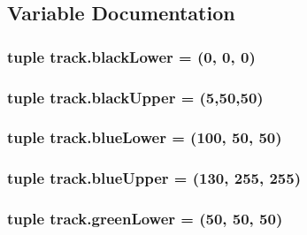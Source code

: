 \subsection{Variable Documentation}
\subsubsection[{\texorpdfstring{black\+Lower}{blackLower}}]{\setlength{\rightskip}{0pt plus 5cm}tuple track.\+black\+Lower = (0, 0, 0)}\hypertarget{namespacetrack_a4ee13246ec46c21cfdcfee1b16f7eec4}{}\label{namespacetrack_a4ee13246ec46c21cfdcfee1b16f7eec4}
\subsubsection[{\texorpdfstring{black\+Upper}{blackUpper}}]{\setlength{\rightskip}{0pt plus 5cm}tuple track.\+black\+Upper = (5,50,50)}\hypertarget{namespacetrack_a7c7120c727a2836315550f0091cd7277}{}\label{namespacetrack_a7c7120c727a2836315550f0091cd7277}
\subsubsection[{\texorpdfstring{blue\+Lower}{blueLower}}]{\setlength{\rightskip}{0pt plus 5cm}tuple track.\+blue\+Lower = (100, 50, 50)}\hypertarget{namespacetrack_a222fd73291da99272b344d9089ce0fde}{}\label{namespacetrack_a222fd73291da99272b344d9089ce0fde}
\subsubsection[{\texorpdfstring{blue\+Upper}{blueUpper}}]{\setlength{\rightskip}{0pt plus 5cm}tuple track.\+blue\+Upper = (130, 255, 255)}\hypertarget{namespacetrack_ae6e375645538a7968d81c8ebe9ee5b7d}{}\label{namespacetrack_ae6e375645538a7968d81c8ebe9ee5b7d}
\subsubsection[{\texorpdfstring{green\+Lower}{greenLower}}]{\setlength{\rightskip}{0pt plus 5cm}tuple track.\+green\+Lower = (50, 50, 50)}\hypertarget{namespacetrack_ae3b9cb19e6647fa48bae473c1b3152ea}{}\label{namespacetrack_ae3b9cb19e6647fa48bae473c1b3152ea}
